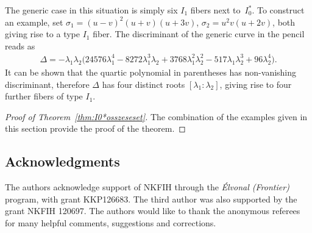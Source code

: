 \documentclass[pdftex]{sigma}
\numberwithin{equation}{section}
\begin{document}
\begin{Example} The generic case in this situation is simply six $I_1$ fibers next to~$I_0^*$.
To construct an example, set $\sigma_1 = (u-v)^2 (u+v) (u+3v)$, $\sigma_2 = u^2 v (u+2v)$, both giving rise to a type $I_1$ fiber.
The discriminant of the generic curve in the pencil reads as
\begin{gather*}
 \Delta = - \lambda_1 \lambda_2 \big(24576 \lambda_1^4 - 8272 \lambda_1^3 \lambda_2 + 3768 \lambda_1^2 \lambda_2^2 -517 \lambda_1 \lambda_2^3 + 96 \lambda_2^4\big).
\end{gather*} It can be shown that the quartic polynomial in parentheses has non-vanishing discriminant, therefore $\Delta$ has four distinct roots $[\lambda_1 : \lambda_2]$, giving rise to four further fibers of type $I_1$.
\end{Example}

\begin{proof}[Proof of Theorem~\ref{thm:I0*osszeseset}]
The combination of the examples given in this section provide the proof of the theorem.
\end{proof}

\subsection*{Acknowledgments}
The authors acknowledge support of NKFIH through the \emph{\'Elvonal (Frontier)} program, with grant KKP126683. The third author was also supported by the grant NKFIH 120697.
The authors would like to thank the anonymous referees for many helpful comments, suggestions and corrections.
\end{document}
